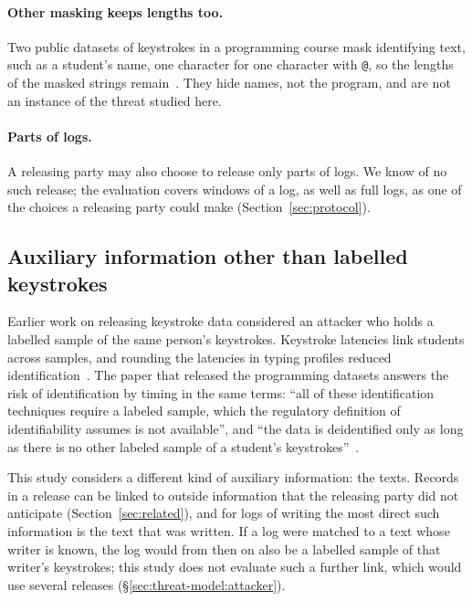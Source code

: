 \paragraph{Other masking keeps lengths too.}
Two public datasets of keystrokes in a programming course mask identifying text, such as a student's name, one
character for one character with \texttt{@}, so the lengths of the masked strings remain~\cite{edwards2023csedm}. They
hide names, not the program, and are not an instance of the threat studied here.

\paragraph{Parts of logs.}
A releasing party may also choose to release only parts of logs. We know of no such release; the evaluation covers
windows of a log, as well as full logs, as one of the choices a releasing party could make (Section~\ref{sec:protocol}).

\subsection{Auxiliary information other than labelled keystrokes}
\label{sec:threat-model:auxiliary}

Earlier work on releasing keystroke data considered an attacker who holds a labelled sample of the same person's
keystrokes. Keystroke latencies link students across samples, and rounding the latencies in typing profiles reduced
identification~\cite{leinonen2017preventing}. The paper that released the programming datasets answers the risk of
identification by timing in the same terms: ``all of these identification techniques require a labeled sample, which
the regulatory definition of identifiability assumes is not available'', and ``the data is deidentified only as long
as there is no other labeled sample of a student's keystrokes''~\cite{edwards2023csedm}.

This study considers a different kind of auxiliary information: the texts. Records in a release can be linked to
outside information that the releasing party did not anticipate (Section~\ref{sec:related}), and for logs of writing
the most direct such information is the text that was written. If a log were matched to a text whose writer is known, the
log would from then on also be a labelled sample of that writer's keystrokes; this study does not evaluate such a
further link, which would use several releases (\S\ref{sec:threat-model:attacker}).

